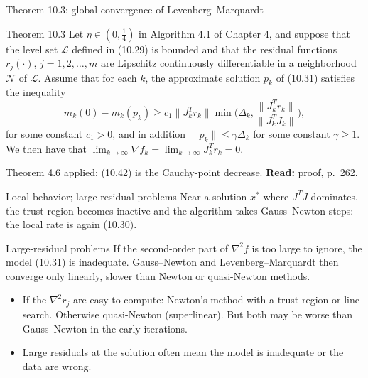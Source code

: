 \documentclass[aspectratio=169,12pt]{beamer}
\newcommand{\xs}{x^{*}}
\newcommand{\gradf}{\nabla f}
\newcommand{\hessf}{\nabla^{2} f}
\newcommand{\Lcal}{\mathcal{L}}
\newcommand{\Ncal}{\mathcal{N}}
\newcommand{\readbook}[1]{{\color{red}\textbf{Read:} #1}}
\begin{document}
\begin{frame}{Theorem 10.3: global convergence of Levenberg--Marquardt}
  \begin{block}{Theorem 10.3}\small
    Let $\eta\in(0,\tfrac14)$ in Algorithm 4.1 of Chapter 4, and suppose that the level set $\Lcal$ defined in
    (10.29) is bounded and that the residual functions $r_{j}(\cdot)$, $j=1,2,\dots,m$ are Lipschitz
    continuously differentiable in a neighborhood $\Ncal$ of $\Lcal$. Assume that for each $k$, the
    approximate solution $p_{k}$ of (10.31) satisfies the inequality
    \[ m_{k}(0)-m_{k}(p_{k})\ge c_{1}\|J_{k}^{T}r_{k}\|\min\Big(\Delta_{k},\frac{\|J_{k}^{T}r_{k}\|}{\|J_{k}^{T}J_{k}\|}\Big), \tag{10.42} \]
    for some constant $c_{1}>0$, and in addition $\|p_{k}\|\le\gamma\Delta_{k}$ for some constant $\gamma\ge 1$.
    We then have that $\lim_{k\to\infty}\gradf_{k}=\lim_{k\to\infty}J_{k}^{T}r_{k}=0$.
  \end{block}

  Theorem 4.6 applied; (10.42) is the Cauchy-point decrease. \readbook{proof, p.~262.}
\end{frame}

\begin{frame}{Local behavior; large-residual problems}
  Near a solution $\xs$ where $J^{T}J$ dominates, the trust region becomes inactive and the
  algorithm takes Gauss--Newton steps: the local rate is again (10.30).

  \vspace{0.4em}
  \begin{alertblock}{Large-residual problems}
    If the second-order part of $\hessf$ is too large to ignore, the model (10.31) is inadequate.
    Gauss--Newton and Levenberg--Marquardt then converge only \alert{linearly}, slower than
    Newton or quasi-Newton methods.
  \end{alertblock}

  \begin{itemize}\setlength\itemsep{0.3em}
    \item If the $\nabla^{2}r_{j}$ are easy to compute: Newton's method with a trust region or line search.
      Otherwise quasi-Newton (superlinear). But both may be worse than Gauss--Newton in the
      early iterations.
    \item Large residuals at the solution often mean the model is inadequate or the data are wrong.
  \end{itemize}
\end{frame}
\end{document}

